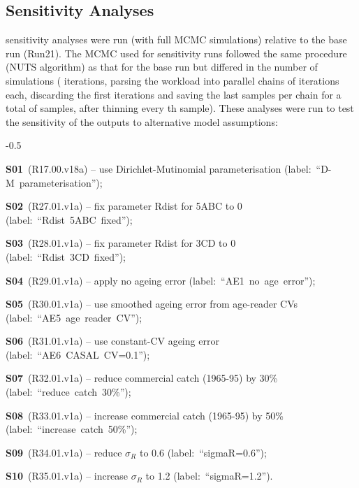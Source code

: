 \documentclass[11pt]{book}
\newcommand{\pc}{\%}
\begin{document}
\subsection{Sensitivity Analyses}\label{ss:sensruns} 


 sensitivity analyses were run (with full MCMC simulations) relative to the base run (Run21).
The MCMC used for sensitivity runs followed the same procedure (NUTS algorithm) as that for the base run but differed in the number of simulations (\nSimsSens{} iterations, parsing the workload into \nChains{} parallel chains of \cSimsSens{} iterations each, discarding the first \cBurnSens{} iterations and saving the last \cSampSens{} samples per chain for a total of \Nmcmc{} samples, after thinning every \nThinSens{}th sample).
These analyses were run to test the sensitivity of the outputs to alternative model assumptions:
\begin{itemize_csas}{-0.5}{}
  \item \textbf{S01}~(R17.00.v18a)  -- use Dirichlet-Mutinomial parameterisation  (label:~``D-M~parameterisation'');
  \item \textbf{S02}~(R27.01.v1a)  -- fix parameter Rdist for 5ABC to 0  (label:~``Rdist~5ABC~fixed'');
  \item \textbf{S03}~(R28.01.v1a)  -- fix parameter Rdist for 3CD to 0  (label:~``Rdist~3CD~fixed'');
  \item \textbf{S04}~(R29.01.v1a)  -- apply no ageing error  (label:~``AE1~no~age~error'');
  \item \textbf{S05}~(R30.01.v1a)  -- use smoothed ageing error from age-reader CVs  (label:~``AE5~age~reader~CV'');
  \item \textbf{S06}~(R31.01.v1a)  -- use constant-CV ageing error  (label:~``AE6~CASAL~CV=0.1'');
  \item \textbf{S07}~(R32.01.v1a)  -- reduce commercial catch (1965-95) by 30\pc{}  (label:~``reduce~catch~30\pc{}'');
  \item \textbf{S08}~(R33.01.v1a)  -- increase commercial catch (1965-95) by 50\pc{}  (label:~``increase~catch~50\pc{}'');
  \item \textbf{S09}~(R34.01.v1a)  -- reduce $\sigma_R$ to 0.6  (label:~``sigmaR=0.6'');
  \item \textbf{S10}~(R35.01.v1a) -- increase $\sigma_R$ to 1.2 (label:~``sigmaR=1.2'').
\end{itemize_csas}
\end{document}
